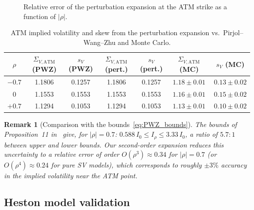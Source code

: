 \documentclass[11pt]{article}
\newtheorem{remark}[theorem]{Remark}
\theoremstyle{definition}
\begin{document}
\begin{figure}[h]
\centering
{}
\caption{Relative error of the perturbation expansion at the ATM strike as a function of $|\rho|$.}\label{fig:error}
\end{figure}

\begin{table}[h]
\centering
\caption{ATM implied volatility and skew from the perturbation expansion vs.\ Pirjol--Wang--Zhu and Monte Carlo.}\label{tab:ATM}
\begin{tabular}{c|cc|cc|cc}
\hline
$\rho$ & $\Sigma_{V,\mathrm{ATM}}$ (PWZ) & $s_V$ (PWZ) & $\Sigma_{V,\mathrm{ATM}}$ (pert.) & $s_V$ (pert.) & $\Sigma_{V,\mathrm{ATM}}$ (MC) & $s_V$ (MC) \\
\hline
$-0.7$ & 1.1806 & 0.1257 & 1.1806 & 0.1257 & $1.18 \pm 0.01$ & $0.13 \pm 0.02$ \\
$0$    & 1.1553 & 0.1553 & 1.1553 & 0.1553 & $1.16 \pm 0.01$ & $0.15 \pm 0.02$ \\
$+0.7$ & 1.1294 & 0.1053 & 1.1294 & 0.1053 & $1.13 \pm 0.01$ & $0.10 \pm 0.02$ \\
\hline
\end{tabular}
\end{table}

\begin{remark}[Comparison with the bounds~\eqref{eq:PWZ_bounds}]\label{rem:comparison}
The bounds of Proposition~11 in~\cite{PWZ2025} give, for $|\rho| = 0.7$: $0.588\,I_0 \leq I_\rho \leq 3.33\,I_0$, a ratio of $5.7:1$ between upper and lower bounds. Our second-order expansion reduces this uncertainty to a relative error of order $O(\rho^3) \approx 0.34$ for $|\rho| = 0.7$ (or $O(\rho^4) \approx 0.24$ for pure SV models), which corresponds to roughly $\pm 3\%$ accuracy in the implied volatility near the ATM point.
\end{remark}

\subsection{Heston model validation}\label{sec:heston_numerics}
\end{document}
